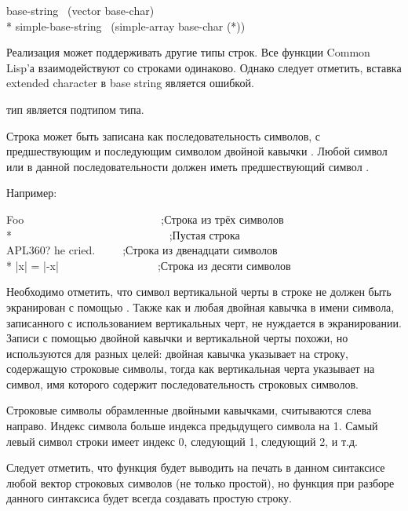 \begin{lisp}
base-string \EQ\ (vector base-char) \\*
simple-base-string \EQ\ (simple-array base-char (*))
\end{lisp}

Реализация может поддерживать другие типы строк. Все функции Common Lisp'а
взаимодействуют со строками одинаково. Однако следует отметить, вставка extended
character в base string является ошибкой.

 тип является подтипом  типа.

Строка может быть записана как последовательность символов, с предшествующим и
последующим символом двойной кавычки \cd{{\Xdquote}}.
Любой символ \cd{{\Xdquote}} или \cd{{\Xbackslash}} в данной последовательности должен
иметь предшествующий символ \cd{{\Xbackslash}}.

Например:
\begin{lisp}
{\Xdquote}Foo{\Xdquote}~~~~~~~~~~~~~~~~~~~~~~~~~;\textrm{Строка из трёх символов} \\*
{\Xdquote}{\Xdquote}~~~~~~~~~~~~~~~~~~~~~~~~~~~~;\textrm{Пустая строка} \\
{\Xdquote}{\Xbackslash}{\Xdquote}APL{\Xbackslash}{\Xbackslash}360?{\Xbackslash}{\Xdquote} he
cried.{\Xdquote}~~~~~;\textrm{Строка из двенадцати символов} \\*
{\Xdquote}|x| = |-x|{\Xdquote}~~~~~~~~~~~~~~~~~~;\textrm{Строка из десяти символов}
\end{lisp}

Необходимо отметить, что символ вертикальной черты \cd{|} в строке не должен быть
экранирован с помощью \cd{{\Xbackslash}}. Также как и любая двойная кавычка в имени
символа, записанного с использованием вертикальных черт, не нуждается в
экранировании. Записи с помощью двойной кавычки и вертикальной черты похожи, но
используются для разных целей: двойная кавычка указывает на строку, содержащую
строковые символы, тогда как вертикальная черта указывает на символ, имя
которого содержит последовательность строковых символов.

Строковые символы обрамленные двойными кавычками, считываются слева
направо. Индекс символа больше индекса предыдущего символа на 1. Самый левый
символ строки имеет индекс 0, следующий 1, следующий 2, и т.д.

Следует отметить, что функция  будет
выводить на печать в данном синтаксисе любой вектор строковых символов (не
только простой), но функция  при разборе данного синтаксиса будет
всегда создавать простую строку.

